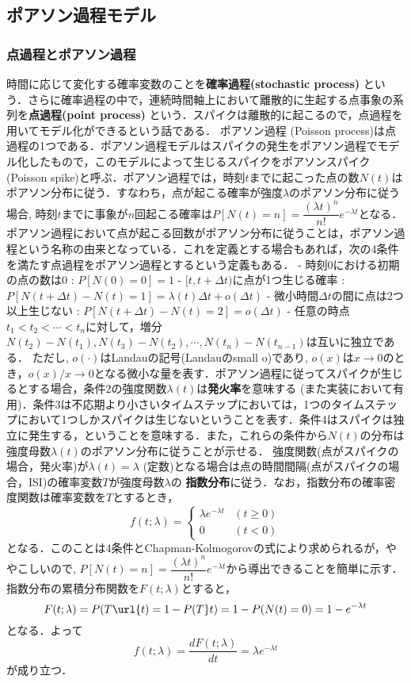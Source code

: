 \subsection{ポアソン過程モデル}\subsubsection{点過程とポアソン過程}時間に応じて変化する確率変数のことを\textbf{確率過程(stochastic process)} という．さらに確率過程の中で，連続時間軸上において離散的に生起する点事象の系列を\textbf{点過程(point process)} という．スパイクは離散的に起こるので，点過程を用いてモデル化ができるという話である．
ポアソン過程 (Poisson process)は点過程の1つである．ポアソン過程モデルはスパイクの発生をポアソン過程でモデル化したもので，このモデルによって生じるスパイクをポアソンスパイク(Poisson spike)と呼ぶ．ポアソン過程では，時刻$t$までに起こった点の数$N(t)$はポアソン分布に従う．すなわち，点が起こる確率が強度$\lambda$のポアソン分布に従う場合, 時刻$t$までに事象が$n$回起こる確率は$P[N(t)=n]=\dfrac{(\lambda t)^{n}}{n !} e^{-\lambda t}$となる． 
ポアソン過程において点が起こる回数がポアソン分布に従うことは，ポアソン過程という名称の由来となっている．これを定義とする場合もあれば，次の4条件を満たす点過程をポアソン過程とするという定義もある．
- 時刻0における初期の点の数は0 : $P[N(0)=0]=1$ 
- $[t, t+\Delta t)$に点が1つ生じる確率 : $P[N(t+\Delta t)-N(t)=1]=\lambda(t)\Delta t+o(\Delta t)$
- 微小時間$\Delta t$の間に点は2つ以上生じない : $P[N(t+\Delta t)-N(t)=2]=o(\Delta t)$
- 任意の時点$t_1 < t_2 < \cdots< t_n$に対して，増分 $N(t_2)-N(t_1), N(t_3)-N(t_2), \cdots, N(t_n)-N(t_{n−1})$は互いに独立である．
ただし, $o(\cdot)$はLandauの記号(Landauのsmall o)であり, $o(x)$は$x\to 0$のとき，$o(x)/x\to 0$となる微小な量を表す．ポアソン過程に従ってスパイクが生じるとする場合，条件2の強度関数$\lambda(t)$は\textbf{発火率}を意味する (また実装において有用)．条件3は不応期より小さいタイムステップにおいては，1つのタイムステップにおいて1つしかスパイクは生じないということを表す．条件4はスパイクは独立に発生する，ということを意味する．また，これらの条件から$N(t)$の分布は強度母数$\lambda(t)$のポアソン分布に従うことが示せる．
強度関数(点がスパイクの場合，発火率)が$\lambda(t)=\lambda$ (定数)となる場合は点の時間間隔(点がスパイクの場合，ISI)の確率変数$T$が強度母数$\lambda$の \textbf{指数分布}に従う．なお，指数分布の確率密度関数は確率変数を$T$とするとき，
$$
f(t;\lambda )=\left\{{\begin{array}{ll}\lambda e^{-\lambda t}&(t\geq 0)\\0&(t<0)\end{array}}\right.
$$
となる．このことは4条件とChapman-Kolmogorovの式により求められるが，ややこしいので, $P[N(t)=n]=\dfrac{(\lambda t)^{n}}{n !} e^{-\lambda t}$から導出できることを簡単に示す．指数分布の累積分布関数を$F(t; \lambda)$とすると，
$$
F(t; \lambda) = P(T\url{t)=1-P(T}t)=1-P(N(t)=0)=1-e^{-\lambda t}
$$
となる．よって
$$
f(t; \lambda)=\frac{dF(t; \lambda)}{dt}=\lambda e^{-\lambda t}
$$
が成り立つ．